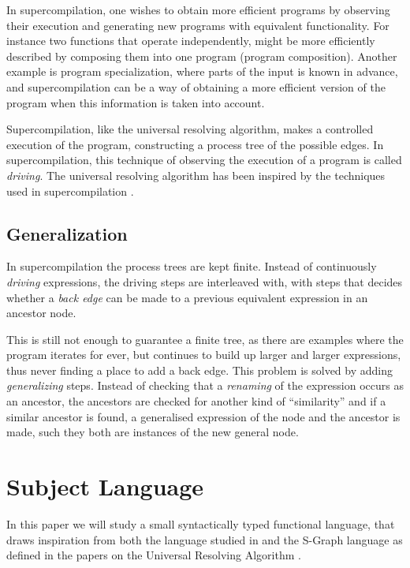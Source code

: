 \documentclass[10pt]{../sigplanconf}
\begin{document}
In supercompilation, one wishes to obtain more efficient programs by
observing their execution and generating new programs with equivalent
functionality. For instance two functions that operate independently,
might be more efficiently described by composing them into one program
(program composition). Another example is program specialization,
where parts of the input is known in advance, and supercompilation can
be a way of obtaining a more efficient version of the program when
this information is taken into account.

Supercompilation, like the universal resolving algorithm, makes a
controlled execution of the program, constructing a process tree of
the possible edges. In supercompilation, this technique of observing
the execution of a program is called \textit{driving}. The universal
resolving algorithm has been inspired by the techniques used in
supercompilation \cite{abramov2002principles}.

\subsection{Generalization}
In supercompilation the process trees are kept finite. Instead of
continuously \textit{driving} expressions, the driving steps are
interleaved with, with steps that decides whether a \textit{back edge}
can be made to a previous equivalent expression in an ancestor node.

This is still not enough to guarantee a finite tree, as there are
examples where the program iterates for ever, but continues to build
up larger and larger expressions, thus never finding a place to add a
back edge. This problem is solved by adding \textit{generalizing}
steps. Instead of checking that a \textit{renaming} of the expression
occurs as an ancestor, the ancestors are checked for another kind of
``similarity'' and if a similar ancestor is found, a generalised
expression of the node and the ancestor is made, such they both are
instances of the new general node.

\section{Subject Language}
\label{sec:trfl}
In this paper we will study a small syntactically typed functional
language, that draws inspiration from both the language studied in
\cite{sorensen1998introduction} and the S-Graph language as defined in
the papers on the Universal Resolving Algorithm
\cite{abramov2000universal, abramov2002universal,
  abramov2002principles}.
\end{document}
